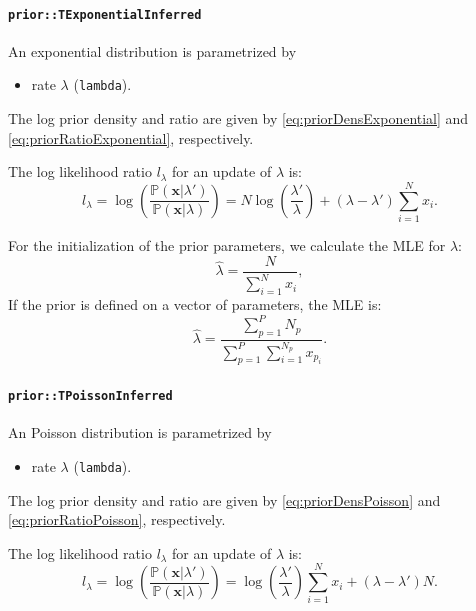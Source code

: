 \documentclass[a4paper,11pt]{article}
\def\p{\mathbb{P}}
\newcommand{\class}[1]{\texttt{#1}}
\newcommand{\privparam}[1]{\texttt{\textunderscore #1}}
\begin{document}
\paragraph{\class{prior::TExponentialInferred}}
An exponential distribution is parametrized by
\begin{itemize}
 \item rate $\lambda$ (\privparam{lambda}).
\end{itemize}
The log prior density and ratio are given by \eqref{eq:priorDensExponential} and \eqref{eq:priorRatioExponential}, respectively.

The log likelihood ratio $l_\lambda$ for an update of $\lambda$ is:
\begin{equation*}
 l_\lambda = \log \left(\frac{\p(\boldsymbol x | \lambda')}{\p(\boldsymbol x | \lambda)} \right) = N \log \left(\frac{\lambda'}{\lambda}\right) + (\lambda - \lambda') \sum_{i=1}^N x_i.
\end{equation*}

For the initialization of the prior parameters, we calculate the MLE for $\hat \lambda$:
\begin{equation*}
 \hat \lambda = \frac{N}{\sum_{i=1}^N x_i} ,
\end{equation*}
If the prior is defined on a vector of parameters, the MLE is:
\begin{equation*}
 \hat \lambda = \frac{\sum_{p=1}^P N_p}{\sum_{p=1}^P \sum_{i=1}^{N_p} x_{p_i}}.
\end{equation*}

\paragraph{\class{prior::TPoissonInferred}}
An Poisson distribution is parametrized by
\begin{itemize}
 \item rate $\lambda$ (\privparam{lambda}).
\end{itemize}

The log prior density and ratio are given by \eqref{eq:priorDensPoisson} and \eqref{eq:priorRatioPoisson}, respectively.

The log likelihood ratio $l_\lambda$ for an update of $\lambda$ is:
\begin{equation*}
 l_\lambda = \log \left(\frac{\p(\boldsymbol x | \lambda')}{\p(\boldsymbol x | \lambda)} \right) = \log \left(\frac{\lambda'}{\lambda}\right) \sum_{i=1}^N x_i + (\lambda - \lambda') N.
\end{equation*}
\end{document}
